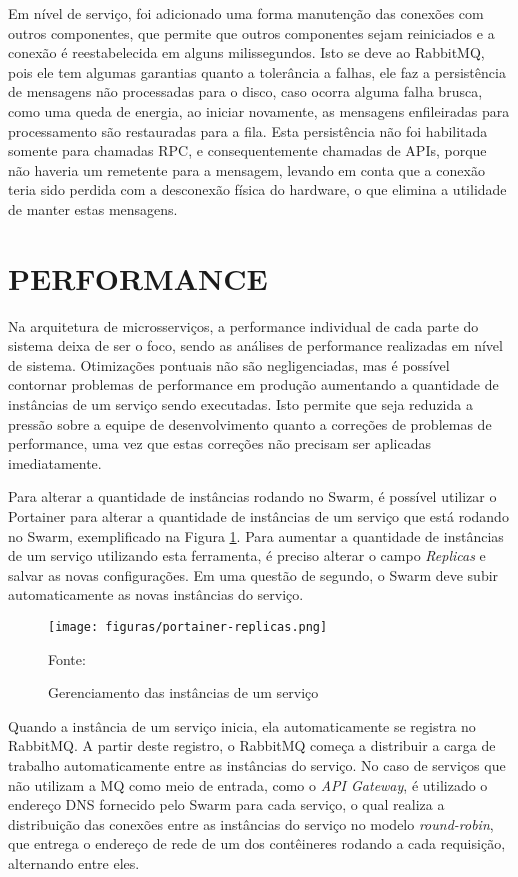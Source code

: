 Em nível de serviço, foi adicionado uma forma manutenção das conexões com
outros componentes, que permite que outros componentes sejam reiniciados e
a conexão é reestabelecida em alguns milissegundos. Isto se deve ao RabbitMQ,
pois ele tem algumas garantias quanto a tolerância a falhas, ele faz a
persistência de mensagens não processadas para o disco, caso ocorra alguma
falha brusca, como uma queda de energia, ao iniciar novamente, as mensagens
enfileiradas para processamento são restauradas para a fila. Esta persistência
não foi habilitada somente para chamadas \ac{RPC}, e consequentemente
chamadas de \acp{API}, porque não haveria um remetente para a mensagem,
levando em conta que a conexão teria sido perdida com a desconexão física
do hardware, o que elimina a utilidade de manter estas mensagens.

\section{PERFORMANCE}

Na arquitetura de microsserviços, a performance individual de cada parte
do sistema deixa de ser o foco, sendo as análises de performance realizadas
em nível de sistema. Otimizações pontuais não são negligenciadas, mas é
possível contornar problemas de performance em produção aumentando a
quantidade de instâncias de um serviço sendo executadas. Isto permite que
seja reduzida a pressão sobre a equipe de desenvolvimento quanto a correções
de problemas de performance, uma vez que estas correções não precisam ser
aplicadas imediatamente.

Para alterar a quantidade de instâncias rodando no Swarm, é possível utilizar
o Portainer para alterar a quantidade de instâncias de um serviço que está
rodando no Swarm, exemplificado na Figura \ref{fig:portainer-replicas}.
Para aumentar a quantidade de instâncias de um serviço utilizando esta
ferramenta, é preciso alterar o campo \emph{Replicas} e salvar as novas
configurações. Em uma questão de segundo, o Swarm deve subir
automaticamente as novas instâncias do serviço.

\begin{figure}[H]
	\centering
	\caption{Gerenciamento das instâncias de um serviço}
	\texttt{[image: figuras/portainer-replicas.png]}

	\label{fig:portainer-replicas}
	\footnotesize Fonte: \fonteOAutor
\end{figure}

Quando a instância de um serviço inicia, ela automaticamente se registra
no RabbitMQ. A partir deste registro, o RabbitMQ começa a distribuir a carga
de trabalho automaticamente entre as instâncias do serviço. No caso de
serviços que não utilizam a \ac{MQ} como meio de entrada, como o
\emph{API Gateway}, é utilizado o endereço \ac{DNS} fornecido pelo Swarm
para cada serviço, o qual realiza a distribuição das conexões entre as
instâncias do serviço no modelo \emph{round-robin}, que entrega o
endereço de rede de um dos contêineres rodando a cada requisição, alternando
entre eles.

